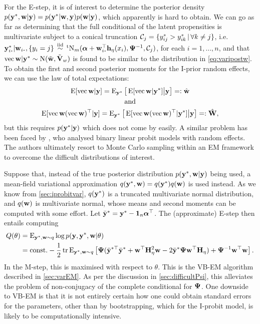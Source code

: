 For the E-step, it is of interest to determine the posterior density $p({\mathbf y}^*,{\mathbf w}|{\mathbf y}) = p({\mathbf y}^*|{\mathbf w},{\mathbf y})p({\mathbf w}|{\mathbf y})$, which apparently is hard to obtain.
We can go as far as determining that the full conditional of the latent propensities is multivariate subject to a conical truncation ${\mathcal C}_j = \{y_{ij}^* > y_{ik}^* \,|\, \forall k \neq j \}$, i.e. $\by^*_{i \bigcdot}|\bw_{i \bigcdot},\{y_i=j\} \iid \tN_m(\balpha + \bw_{i \bigcdot}^\top\bh_\eta(x_i), \bPsi^{-1},\cC_j)$, for each $i=1,\dots,n$, and that $\operatorname{vec} {\mathbf w}|{\mathbf y}^*\sim \operatorname{N}(\tilde{{\mathbf w}},\tilde{{\mathbf V}}_w)$ is found to be similar to the distribution in \cref{eq:varipostw}.
To obtain the first and second posterior moments for the I-prior random effects, we can use the law of total expectations:
\begin{gather*}
  \operatorname{E}[\operatorname{vec} {\mathbf w}|{\mathbf y}]
  = \operatorname{E}_{{\mathbf y}^*} \big[ \operatorname{E}[\operatorname{vec} {\mathbf w} | {\mathbf y}^*] \big| {\mathbf y} \big] =: \hat{{\mathbf w}} \\
  \text{and}\\
  \operatorname{E}[\operatorname{vec} {\mathbf w} (\operatorname{vec} {\mathbf w})^\top|{\mathbf y}]
  = \operatorname{E}_{{\mathbf y}^*} \big[ \operatorname{E}[\operatorname{vec} {\mathbf w} (\operatorname{vec} {\mathbf w})^\top| {\mathbf y}^*] \big| {\mathbf y} \big] =: \hat{{\mathbf W}} ,
\end{gather*}
but this requires $p({\mathbf y}^*|{\mathbf y})$ which does not come by easily.
A similar problem has been faced by \citet{chan1997maximum}, who analysed binary linear probit models with random effects.
The authors ultimately resort to Monte Carlo sampling within an EM framework to overcome the difficult distributions of interest.

Suppose that, instead of the true posterior distribution $p({\mathbf y}^*,{\mathbf w}|{\mathbf y})$ being used, a mean-field variational approximation $q({\mathbf y}^*,{\mathbf w}) = q({\mathbf y}^*)q({\mathbf w})$ is used instead.
As we know from \cref{sec:iprobitvar}, $q({\mathbf y}^*)$ is a truncated multivariate normal distribution, and $q({\mathbf w})$ is multivariate normal, whose means and second moments can be computed with some  effort.
Let $\bar{{\mathbf y}}^* = {\mathbf y}^* - {\mathbf 1}_n{\bm\alpha}^\top$.
The (approximate) E-step then entails computing
\begin{align*}
  Q(\theta) 
  &= \operatorname{E}_{{\mathbf y}^*,{\mathbf w}\sim q}  \log p({\mathbf y},{\mathbf y}^*,{\mathbf w}|\theta) \\
  &= \text{const.}\hspace{0.01em} -\frac{1}{2} \operatorname{tr}\operatorname{E}_{{\mathbf y}^*,{\mathbf w}\sim q} \left[ 
  {\bm\Psi}(\bar{{\mathbf y}}^{*\top}\bar{{\mathbf y}}^* + {\mathbf w}^\top{\mathbf H}_\eta^2{\mathbf w} - 2\bar{{\mathbf y}}^*{\bm\Psi}{\mathbf w}^\top{\mathbf H}_\eta )
  + {\bm\Psi}^{-1} {\mathbf w}^\top{\mathbf w} 
  \right].
\end{align*}
In the M-step, this is maximised with respect to $\theta$.
This is the VB-EM algorithm described in \cref{sec:varEM}.
As per the discussion in \cref{sec:difficultPsi}, this alleviates the problem of non-conjugacy of the complete conditional for ${\bm\Psi}$.
One downside to VB-EM is that it is not entirely certain how one could obtain standard errors for the parameters, other than by bootstrapping, which for the I-probit model, is likely to be computationally intensive.
